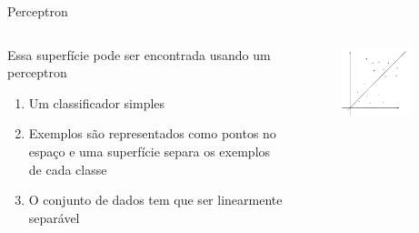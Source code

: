 \documentclass{beamer}
\begin{document}
\begin{frame}{Perceptron}
\begin{columns}
    \begin{column}{.49\textwidth}
    Essa superfície pode ser encontrada usando um perceptron
      \begin{enumerate}
      \item {
        Um classificador simples
      }
      \item {
        Exemplos são representados como pontos no espaço e uma superfície separa os exemplos de cada classe
      }
      \item {
        O conjunto de dados tem que ser linearmente separável
      }
      \end{enumerate}
    \end{column}
    \begin{column}{.49\textwidth}
    \begin{figure}
      \centering
      \includegraphics[width=0.8\textwidth]{perceptron_1.png}
    \end{figure}
    \end{column}
\end{columns}
\end{frame}
\end{document}
